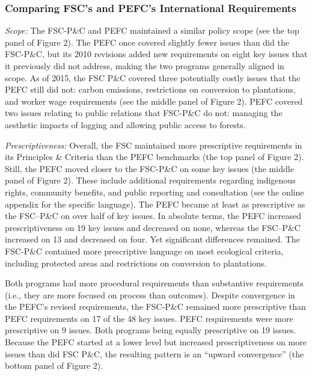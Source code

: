 \documentclass[
      12pt,
            Review ]{article}
\begin{document}
\hypertarget{comparing-fscs-and-pefcs-international-requirements}{%
\subsubsection{Comparing FSC's and PEFC's International Requirements}\label{comparing-fscs-and-pefcs-international-requirements}}

\emph{Scope:} The FSC-P\&C and PEFC maintained a similar policy scope (see the top panel of Figure 2). The PEFC once covered slightly fewer issues than did the FSC-P\&C, but its 2010 revisions added new requirements on eight key issues that it previously did not address, making the two programs generally aligned in scope. As of 2015, the FSC P\&C covered three potentially costly issues that the PEFC still did not: carbon emissions, restrictions on conversion to plantations, and worker wage requirements (see the middle panel of Figure 2). PEFC covered two issues relating to public relations that FSC-P\&C do not: managing the aesthetic impacts of logging and allowing public access to forests.

\emph{Prescriptiveness:} Overall, the FSC maintained more prescriptive requirements in its Principles \& Criteria than the PEFC benchmarks (the top panel of Figure 2). Still, the PEFC moved closer to the FSC-P\&C on some key issues (the middle panel of Figure 2). These include additional requirements regarding indigenous rights, community benefits, and public reporting and consultation (see the online appendix for the specific language). The PEFC became at least as prescriptive as the FSC--P\&C on over half of key issues. In absolute terms, the PEFC increased prescriptiveness on 19 key issues and decreased on none, whereas the FSC--P\&C increased on 13 and decreased on four. Yet significant differences remained. The FSC-P\&C contained more prescriptive language on most ecological criteria, including protected areas and restrictions on conversion to plantations.

Both programs had more procedural requirements than substantive requirements (i.e., they are more focused on process than outcomes). Despite convergence in the PEFC's revised requirements, the FSC-P\&C remained more prescriptive than PEFC requirements on 17 of the 48 key issues. PEFC requirements were more prescriptive on 9 issues. Both programs being equally prescriptive on 19 issues. Because the PEFC started at a lower level but increased prescriptiveness on more issues than did FSC P\&C, the resulting pattern is an ``upward convergence'' (the bottom panel of Figure 2).
\end{document}

